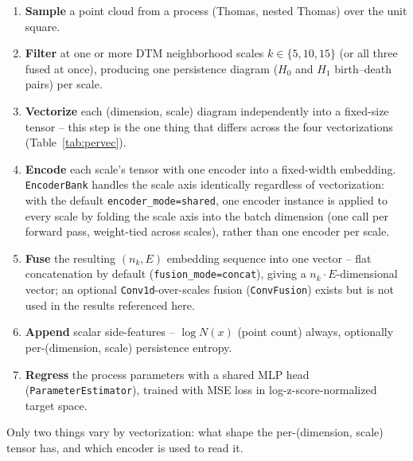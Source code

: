 \documentclass[11pt]{article}
\newcommand{\nk}{n_k}
\begin{document}
\begin{enumerate}
  \item \textbf{Sample} a point cloud from a process (Thomas, nested Thomas) over the
    unit square.
  \item \textbf{Filter} at one or more DTM neighborhood scales $k \in \{5,10,15\}$
    (or all three fused at once), producing one persistence diagram ($H_0$ and $H_1$
    birth--death pairs) per scale.
  \item \textbf{Vectorize} each (dimension, scale) diagram independently into a
    fixed-size tensor -- this step is the one thing that differs across the four
    vectorizations (Table~\ref{tab:pervec}).
  \item \textbf{Encode} each scale's tensor with one encoder into a fixed-width
    embedding. \texttt{EncoderBank} handles the scale axis identically regardless of
    vectorization: with the default \texttt{encoder\_mode=shared}, one encoder
    instance is applied to every scale by folding the scale axis into the batch
    dimension (one call per forward pass, weight-tied across scales), rather than one
    encoder per scale.
  \item \textbf{Fuse} the resulting $(\nk, E)$ embedding sequence into one vector --
    flat concatenation by default (\texttt{fusion\_mode=concat}), giving a
    $\nk\!\cdot\!E$-dimensional vector; an optional \texttt{Conv1d}-over-scales fusion
    (\texttt{ConvFusion}) exists but is not used in the results referenced here.
  \item \textbf{Append} scalar side-features -- $\log N(x)$ (point count) always,
    optionally per-(dimension, scale) persistence entropy.
  \item \textbf{Regress} the process parameters with a shared MLP head
    (\texttt{ParameterEstimator}), trained with MSE loss in log-z-score-normalized
    target space.
\end{enumerate}

Only two things vary by vectorization: what shape the per-(dimension, scale) tensor
has, and which encoder is used to read it.
\end{document}
